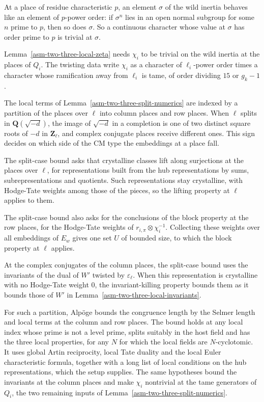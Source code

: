 At a place of residue characteristic $p$, an element $\sigma$ of the wild
inertia behaves like an element of $p$-power order: if $\sigma^n$ lies in an
open normal subgroup for some $n$ prime to $p$, then so does $\sigma$. So a
continuous character whose value at $\sigma$ has order prime to $p$ is trivial
at $\sigma$.

Lemma~\ref{asm-two-three-local-zeta} needs $\chi_i$ to be trivial on the wild
inertia at the places of $Q_i$. The twisting data write $\chi_i$ as a
character of $\ell_i$-power order times a character whose ramification away
from $\ell_i$ is tame, of order dividing $15$ or $g_k-1$.

The local terms of Lemma~\ref{asm-two-three-split-numerics} are indexed by a
partition of the places over $\ell$ into column places and row places. When
$\ell$ splits in $\mathbf Q(\sqrt{-d})$, the image of $\sqrt{-d}$ in a
completion is one of two distinct square roots of $-d$ in $\mathbf Z_\ell$, and
complex conjugate places receive different ones. This sign decides on which
side of the CM type the embeddings at a place fall.

The split-case bound asks that crystalline classes lift along surjections at
the places over $\ell$, for representations built from the hub representations
by sums, subrepresentations and quotients. Such representations stay
crystalline, with Hodge-Tate weights among those of the pieces, so the lifting
property at $\ell$ applies to them.

The split-case bound also asks for the conclusions of the block property at
the row places, for the Hodge-Tate weights of $r_{i,\pi}\otimes\chi_i^{-1}$.
Collecting these weights over all embeddings of $E_w$ gives one set $U$ of
bounded size, to which the block property at $\ell$ applies.

At the complex conjugates of the column places, the split-case bound uses the
invariants of the dual of $W'$ twisted by $\varepsilon_\ell$. When this
representation is crystalline with no Hodge-Tate weight $0$, the
invariant-killing property bounds them as it bounds those of $W'$ in
Lemma~\ref{asm-two-three-local-invariants}.

For such a partition, Alpöge bounds the congruence length by the Selmer length
and local terms at the column and row places. The bound holds at any local index
whose prime is not a level prime, splits suitably in the host field and has the
three local properties, for any $N$ for which the local fields are
$N$-cyclotomic. It uses global Artin reciprocity, local Tate duality and the
local Euler characteristic formula, together with a long list of local
conditions on the hub representations, which the setup supplies. The same
hypotheses bound the invariants at the column places and make $\chi_i$
nontrivial at the tame generators of $Q_i$, the two remaining inputs of
Lemma~\ref{asm-two-three-split-numerics}.

